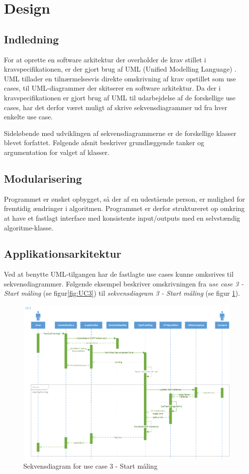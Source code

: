 \documentclass[rapport.tex]{subfiles}
\begin{document}
	\section{Design}
		\subsection{Indledning}
	For at oprette en software arkitektur der overholder de krav stillet i kravspecifikationen, er der gjort brug af UML (Unified Modelling Language) \cite{UML}. UML tillader en tilnærmelsesvis direkte omskrivning af krav opstillet som use cases, til UML-diagrammer der skitserer en software arkitektur. 
	Da der i kravspecifikationen er gjort brug af UML til udarbejdelse af de forskellige use cases, har det derfor været muligt af skrive sekvensdiagrammer ud fra hver enkelte use case. 
	
	Sideløbende med udviklingen af sekvensdiagrammerne er de forskellige klasser blevet forfattet. Følgende afsnit beskriver grundlæggende tanker og argumentation for valget af klasser.

	
	\subsection{Modularisering}
	Programmet er ønsket opbygget, så der af en udestående person, er mulighed for fremtidig ændringer i algoritmen. Programmet er derfor struktureret op omkring at have et fastlagt interface med konsistente input/outputs med en selvstændig algoritme-klasse. 
	\subsection{Applikationsarkitektur}
	Ved at benytte UML-tilgangen har de fastlagte use cases kunne omksrives til sekvensdiagrammer. 
	Følgende eksempel beskriver omskrivningen fra \textit{use case 3 - Start måling} (se figur\ref{fig:UC3}) til \textit{sekvensdiagram 3 - Start måling} (se figur \ref{fig:UCseq3}).
	
	
	
	\begin{figure}
		\centering
		\includegraphics[width=1\linewidth]{UC3}
		\caption[Sekvensdiagram - UC3]{Sekvensdiagram for use case 3 - Start måling}
		\label{fig:UCseq3}
	\end{figure}
	
\end{document}
